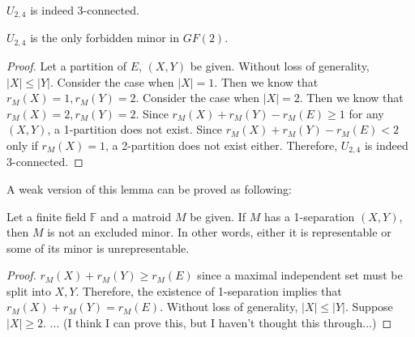 \begin{thm}
$U_{2, 4}$ is indeed 3-connected.
\end{thm}
$U_{2, 4}$ is the only forbidden minor in $GF(2)$.
\begin{proof}
Let a partition of $E$, $(X, Y)$ be given.
Without loss of generality, $\lvert X \rvert \leq \lvert Y \rvert$.
Consider the case when $\lvert X \rvert = 1$.
Then we know that $r_M(X) = 1, r_M(Y) = 2$.
Consider the case when $\lvert X \rvert = 2$.
Then we know that $r_M(X) = 2, r_M(Y) = 2$.
Since $r_M(X) + r_M(Y) - r_M(E) \geq 1$ for any $(X, Y)$, a 1-partition does not exist.
Since $r_M(X) + r_M(Y) - r_M(E) < 2$ only if $r_M(X) = 1$, a 2-partition does not exist either.
Therefore, $U_{2, 4}$ is indeed 3-connected.
\end{proof}

A weak version of this lemma can be proved as following:

\begin{lem}
Let a finite field $\mathbb{F}$ and a matroid $M$ be given.
If $M$ has a 1-separation $(X, Y)$, then $M$ is not an excluded minor.
In other words, either it is representable or some of its minor is unrepresentable.
\end{lem}

\begin{proof}
$r_M(X) + r_M(Y) \geq r_M(E)$ since a maximal independent set must be split into $X, Y$.
Therefore, the existence of 1-separation implies that $r_M(X) + r_M(Y) = r_M(E)$.
Without loss of generality, $\lvert X \rvert \leq \lvert Y \rvert$.
Suppose $\lvert X \rvert \geq 2$.
... (I think I can prove this, but I haven't thought this through...)
\end{proof}

